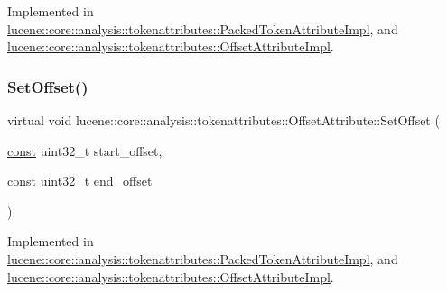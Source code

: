 Implemented in \mbox{\hyperlink{classlucene_1_1core_1_1analysis_1_1tokenattributes_1_1PackedTokenAttributeImpl_ae6210d544884be562c186a040d91157f}{lucene\+::core\+::analysis\+::tokenattributes\+::\+Packed\+Token\+Attribute\+Impl}}, and \mbox{\hyperlink{classlucene_1_1core_1_1analysis_1_1tokenattributes_1_1OffsetAttributeImpl_a1e70ec558f605ea2313e41ba5c64e379}{lucene\+::core\+::analysis\+::tokenattributes\+::\+Offset\+Attribute\+Impl}}.

\mbox{\label{classlucene_1_1core_1_1analysis_1_1tokenattributes_1_1OffsetAttribute_aa0d076ac2e7c5af86668fbbeb8e26170}} 
\subsubsection{\texorpdfstring{Set\+Offset()}{SetOffset()}}
{\footnotesize\ttfamily virtual void lucene\+::core\+::analysis\+::tokenattributes\+::\+Offset\+Attribute\+::\+Set\+Offset (\begin{DoxyParamCaption}\item[{\mbox{\hyperlink{ZlibCrc32_8h_a2c212835823e3c54a8ab6d95c652660e}{const}} uint32\+\_\+t}]{start\+\_\+offset,  }\item[{\mbox{\hyperlink{ZlibCrc32_8h_a2c212835823e3c54a8ab6d95c652660e}{const}} uint32\+\_\+t}]{end\+\_\+offset }\end{DoxyParamCaption})\hspace{0.3cm}{\ttfamily [pure virtual]}}



Implemented in \mbox{\hyperlink{classlucene_1_1core_1_1analysis_1_1tokenattributes_1_1PackedTokenAttributeImpl_aa17ed401f2b9f6bd773291de1d02bb35}{lucene\+::core\+::analysis\+::tokenattributes\+::\+Packed\+Token\+Attribute\+Impl}}, and \mbox{\hyperlink{classlucene_1_1core_1_1analysis_1_1tokenattributes_1_1OffsetAttributeImpl_ab554b85bf6d64ce023c0634b3883c803}{lucene\+::core\+::analysis\+::tokenattributes\+::\+Offset\+Attribute\+Impl}}.

\mbox{\label{classlucene_1_1core_1_1analysis_1_1tokenattributes_1_1OffsetAttribute_af841d190a7900a5b6a00f0a9f4ae7e43}} 
